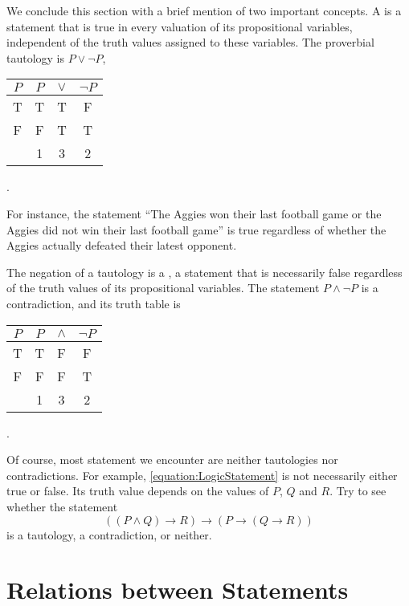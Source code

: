 We conclude this section with a brief mention of two important concepts.
A  is a statement that is true in every valuation of its propositional variables, independent of the truth values assigned to these variables.
The proverbial tautology is $P \vee \neg P$,
\begin{center}
\begin{tabular}{|c|ccc|}
\hline
$P$ & $P$ & $\vee$ & $\neg P$ \\
\hline
T & T & T & F \\
F & F & T & T \\
& 1 & 3 & 2 \\
\hline
\end{tabular} .
\end{center}
For instance, the statement ``The Aggies won their last football game or the Aggies did not win their last football game'' is true regardless of whether the Aggies actually defeated their latest opponent.

The negation of a tautology is a , a statement that is necessarily false regardless of the truth values of its propositional variables.
The statement $P \wedge \neg P$ is a contradiction, and its truth table is
\begin{center}
\begin{tabular}{|c|ccc|}
\hline
$P$ & $P$ & $\wedge$ & $\neg P$ \\
\hline
T & T & F & F \\
F & F & F & T \\
& 1 & 3 & 2 \\
\hline
\end{tabular} .
\end{center}

Of course, most statement we encounter are neither tautologies nor contradictions.
For example, \eqref{equation:LogicStatement} is not necessarily either true or false.
Its truth value depends on the values of $P$, $Q$ and $R$.
Try to see whether the statement
\begin{equation*}
((P \wedge Q) \rightarrow R) \rightarrow (P \rightarrow (Q \rightarrow R))
\end{equation*}
is a tautology, a contradiction, or neither.


\section{Relations between Statements}
\label{section:Relations}

